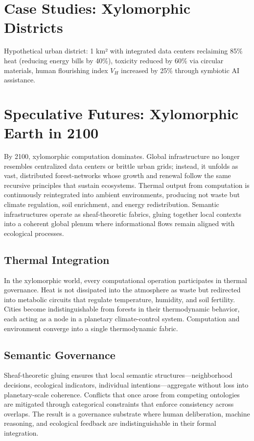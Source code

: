 \documentclass[12pt]{article}
\begin{document}
\section{Case Studies: Xylomorphic Districts}

Hypothetical urban district: 1 km² with integrated data centers reclaiming 85\% heat (reducing energy bills by 40\%), toxicity reduced by 60\% via circular materials, human flourishing index $V_H$ increased by 25\% through symbiotic AI assistance.


\section{Speculative Futures: Xylomorphic Earth in 2100}

By 2100, xylomorphic computation dominates. Global infrastructure no longer resembles centralized data centers or brittle urban grids; instead, it unfolds as vast, distributed forest-networks whose growth and renewal follow the same recursive principles that sustain ecosystems. Thermal output from computation is continuously reintegrated into ambient environments, producing not waste but climate regulation, soil enrichment, and energy redistribution. Semantic infrastructures operate as sheaf-theoretic fabrics, gluing together local contexts into a coherent global plenum where informational flows remain aligned with ecological processes.

\subsection{Thermal Integration}

In the xylomorphic world, every computational operation participates in thermal governance. Heat is not dissipated into the atmosphere as waste but redirected into metabolic circuits that regulate temperature, humidity, and soil fertility. Cities become indistinguishable from forests in their thermodynamic behavior, each acting as a node in a planetary climate-control system. Computation and environment converge into a single thermodynamic fabric.

\subsection{Semantic Governance}

Sheaf-theoretic gluing ensures that local semantic structures---neighborhood decisions, ecological indicators, individual intentions---aggregate without loss into planetary-scale coherence. Conflicts that once arose from competing ontologies are mitigated through categorical constraints that enforce consistency across overlaps. The result is a governance substrate where human deliberation, machine reasoning, and ecological feedback are indistinguishable in their formal integration.
\end{document}
